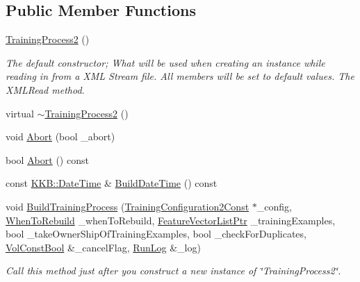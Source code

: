 \subsection*{Public Member Functions}
\begin{DoxyCompactItemize}
\item 
\hyperlink{class_k_k_m_l_l_1_1_training_process2_a56455bc6c87316ccfd3afbe4c3323f5e}{Training\+Process2} ()
\begin{DoxyCompactList}\small\item\em The default constructor; What will be used when creating an instance while reading in from a X\+ML Stream file. All members will be set to default values. The X\+M\+L\+Read method. \end{DoxyCompactList}\item 
virtual \hyperlink{class_k_k_m_l_l_1_1_training_process2_a96c8825f210d65cd3f0f23f702da07b9}{$\sim$\+Training\+Process2} ()
\item 
void \hyperlink{class_k_k_m_l_l_1_1_training_process2_a11725f4aac3b45c7a070bc78aa406724}{Abort} (bool \+\_\+abort)
\item 
bool \hyperlink{class_k_k_m_l_l_1_1_training_process2_a5e5fad4ad447c8fdb38ab59da4c17aff}{Abort} () const 
\item 
const \hyperlink{class_k_k_b_1_1_date_time}{K\+K\+B\+::\+Date\+Time} \& \hyperlink{class_k_k_m_l_l_1_1_training_process2_a9e7c7d8c3ad4b7b80859c9093ebf6aaf}{Build\+Date\+Time} () const 
\item 
void \hyperlink{class_k_k_m_l_l_1_1_training_process2_a8b80079d09f7813e347343ebbefb14fb}{Build\+Training\+Process} (\hyperlink{namespace_k_k_m_l_l_abec6237fd9c0112ff72b75b10d4b5696}{Training\+Configuration2\+Const} $\ast$\+\_\+config, \hyperlink{class_k_k_m_l_l_1_1_training_process2_acc48e76f6978c8c8c0c849eec2d0ee53}{When\+To\+Rebuild} \+\_\+when\+To\+Rebuild, \hyperlink{namespace_k_k_m_l_l_acf2ba92a3cf03e2b19674b24ff488ef6}{Feature\+Vector\+List\+Ptr} \+\_\+training\+Examples, bool \+\_\+take\+Owner\+Ship\+Of\+Training\+Examples, bool \+\_\+check\+For\+Duplicates, \hyperlink{namespace_k_k_b_a7d390f568e2831fb76b86b56c87bf92f}{Vol\+Const\+Bool} \&\+\_\+cancel\+Flag, \hyperlink{class_k_k_b_1_1_run_log}{Run\+Log} \&\+\_\+log)
\begin{DoxyCompactList}\small\item\em Call this method just after you construct a new instance of \char`\"{}\+Training\+Process2\char`\"{}. \end{DoxyCompactList}\item 

\end{DoxyCompactItemize}
